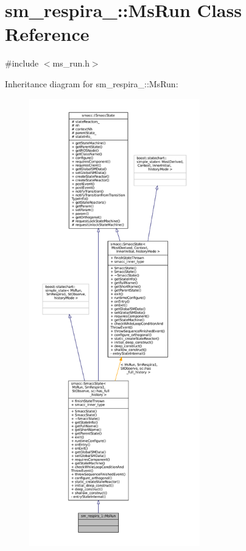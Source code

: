 \hypertarget{classsm__respira__1_1_1MsRun}{}\section{sm\+\_\+respira\+\_\+:\+:Ms\+Run Class Reference}
\label{classsm__respira__1_1_1MsRun}


{\ttfamily \#include $<$ms\+\_\+run.\+h$>$}



Inheritance diagram for sm\+\_\+respira\+\_\+:\+:Ms\+Run\+:
\nopagebreak
\begin{figure}[H]
\begin{center}
\leavevmode
\includegraphics[height=550pt]{classsm__respira__1_1_1MsRun__inherit__graph}
\end{center}
\end{figure}


